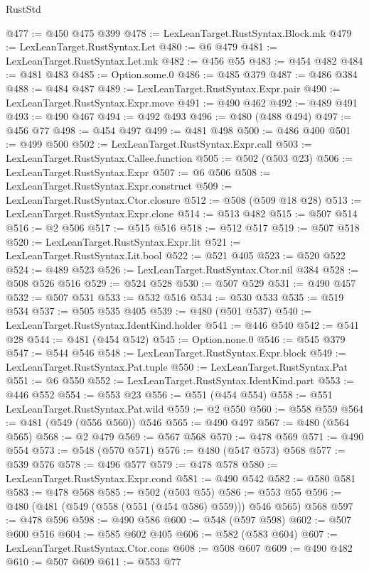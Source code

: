 \begin{lexlean}{RustStd}
\begin{coremodule}
@477 := @450 @475 @399
@478 := LexLeanTarget.RustSyntax.Block.mk
@479 := LexLeanTarget.RustSyntax.Let
@480 := @6 @479
@481 := LexLeanTarget.RustSyntax.Let.mk
@482 := @456 @55
@483 := @454 @482
@484 := @481 @483
@485 := Option.some.{0}
@486 := @485 @379
@487 := @486 @384
@488 := @484 @487
@489 := LexLeanTarget.RustSyntax.Expr.pair
@490 := LexLeanTarget.RustSyntax.Expr.move
@491 := @490 @462
@492 := @489 @491
@493 := @490 @467
@494 := @492 @493
@496 := @480 (@488 @494)
@497 := @456 @77
@498 := @454 @497
@499 := @481 @498
@500 := @486 @400
@501 := @499 @500
@502 := LexLeanTarget.RustSyntax.Expr.call
@503 := LexLeanTarget.RustSyntax.Callee.function
@505 := @502 (@503 @23)
@506 := LexLeanTarget.RustSyntax.Expr
@507 := @6 @506
@508 := LexLeanTarget.RustSyntax.Expr.construct
@509 := LexLeanTarget.RustSyntax.Ctor.closure
@512 := @508 (@509 @18 @28)
@513 := LexLeanTarget.RustSyntax.Expr.clone
@514 := @513 @482
@515 := @507 @514
@516 := @2 @506
@517 := @515 @516
@518 := @512 @517
@519 := @507 @518
@520 := LexLeanTarget.RustSyntax.Expr.lit
@521 := LexLeanTarget.RustSyntax.Lit.bool
@522 := @521 @405
@523 := @520 @522
@524 := @489 @523
@526 := LexLeanTarget.RustSyntax.Ctor.nil @384
@528 := @508 @526 @516
@529 := @524 @528
@530 := @507 @529
@531 := @490 @457
@532 := @507 @531
@533 := @532 @516
@534 := @530 @533
@535 := @519 @534
@537 := @505 @535 @405
@539 := @480 (@501 @537)
@540 := LexLeanTarget.RustSyntax.IdentKind.holder
@541 := @446 @540
@542 := @541 @28
@544 := @481 (@454 @542)
@545 := Option.none.{0}
@546 := @545 @379
@547 := @544 @546
@548 := LexLeanTarget.RustSyntax.Expr.block
@549 := LexLeanTarget.RustSyntax.Pat.tuple
@550 := LexLeanTarget.RustSyntax.Pat
@551 := @6 @550
@552 := LexLeanTarget.RustSyntax.IdentKind.part
@553 := @446 @552
@554 := @553 @23
@556 := @551 (@454 @554)
@558 := @551 LexLeanTarget.RustSyntax.Pat.wild
@559 := @2 @550
@560 := @558 @559
@564 := @481 (@549 (@556 @560)) @546
@565 := @490 @497
@567 := @480 (@564 @565)
@568 := @2 @479
@569 := @567 @568
@570 := @478 @569
@571 := @490 @554
@573 := @548 (@570 @571)
@576 := @480 (@547 @573) @568
@577 := @539 @576
@578 := @496 @577
@579 := @478 @578
@580 := LexLeanTarget.RustSyntax.Expr.cond
@581 := @490 @542
@582 := @580 @581
@583 := @478 @568
@585 := @502 (@503 @55)
@586 := @553 @55
@596 := @480 (@481 (@549 (@558 (@551 (@454 @586) @559))) @546 @565) @568
@597 := @478 @596
@598 := @490 @586
@600 := @548 (@597 @598)
@602 := @507 @600 @516
@604 := @585 @602 @405
@606 := @582 (@583 @604)
@607 := LexLeanTarget.RustSyntax.Ctor.cons
@608 := @508 @607
@609 := @490 @482
@610 := @507 @609
@611 := @553 @77

\end{coremodule}
\end{lexlean}
